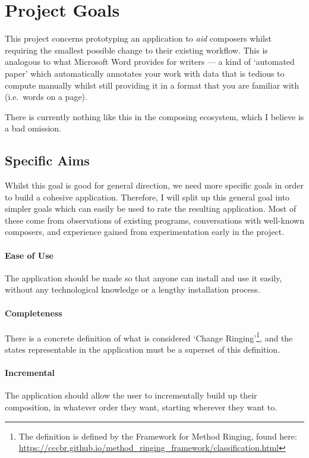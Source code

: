 \documentclass[12pt]{article}
\begin{document}
\pagebreak

\section{Project Goals}

This project concerns prototyping an application to \emph{aid} composers whilst requiring the
smallest possible change to their existing workflow.  This is analogous to what Microsoft Word
provides for writers --- a kind of `automated paper' which automatically annotates your work with
data that is tedious to compute manually whilst still providing it in a format that you are familiar
with (i.e.\ words on a page).

There is currently nothing like this in the composing ecosystem, which I believe is a bad omission.

\subsection{Specific Aims}

Whilst this goal is good for general direction, we need more specific goals in order to build a
cohesive application.  Therefore, I will split up this general goal into simpler goals which can
easily be used to rate the resulting application.  Most of these come from observations of existing
programs, conversations with well-known composers, and experience gained from experimentation early
in the project.

\paragraph{Ease of Use} The application should be made so that anyone can install and use it easily,
without any technological knowledge or a lengthy installation process.

\paragraph{Completeness} There is a concrete definition of what is considered `Change
Ringing'\footnote{The definition is defined by the Framework for Method Ringing, found here:
\url{https://cccbr.github.io/method_ringing_framework/classification.html}}, and the states
representable in the application must be a superset of this definition.

\paragraph{Incremental} The application should allow the user to incrementally build up their
composition, in whatever order they want, starting wherever they want to.
\end{document}
